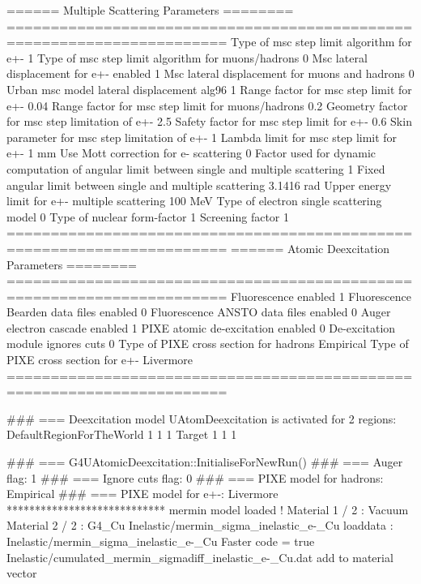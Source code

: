 ======                 Multiple Scattering Parameters          ========
=======================================================================
Type of msc step limit algorithm for e+-           1
Type of msc step limit algorithm for muons/hadrons 0
Msc lateral displacement for e+- enabled           1
Msc lateral displacement for muons and hadrons     0
Urban msc model lateral displacement alg96         1
Range factor for msc step limit for e+-            0.04
Range factor for msc step limit for muons/hadrons  0.2
Geometry factor for msc step limitation of e+-     2.5
Safety factor for msc step limit for e+-           0.6
Skin parameter for msc step limitation of e+-      1
Lambda limit for msc step limit for e+-            1 mm
Use Mott correction for e- scattering              0
Factor used for dynamic computation of angular 
  limit between single and multiple scattering     1
Fixed angular limit between single 
  and multiple scattering                          3.1416 rad
Upper energy limit for e+- multiple scattering     100 MeV
Type of electron single scattering model           0
Type of nuclear form-factor                        1
Screening factor                                   1
=======================================================================
======                 Atomic Deexcitation Parameters          ========
=======================================================================
Fluorescence enabled                               1
Fluorescence Bearden data files enabled            0
Fluorescence ANSTO data files enabled              0
Auger electron cascade enabled                     1
PIXE atomic de-excitation enabled                  0
De-excitation module ignores cuts                  0
Type of PIXE cross section for hadrons             Empirical
Type of PIXE cross section for e+-                 Livermore
=======================================================================

### ===  Deexcitation model UAtomDeexcitation is activated for 2 regions:
          DefaultRegionForTheWorld  1  1  1
          Target  1  1  1

### === G4UAtomicDeexcitation::InitialiseForNewRun()
### ===  Auger flag: 1
### ===  Ignore cuts flag:   0
### ===  PIXE model for hadrons: Empirical
### ===  PIXE model for e+-:     Livermore
****************************
mermin model loaded !
Material 1 / 2 : Vacuum
Material 2 / 2 : G4_Cu
Inelastic/mermin_sigma_inelastic_e-_Cu
loaddata : Inelastic/mermin_sigma_inelastic_e-_Cu
Faster code = true
Inelastic/cumulated_mermin_sigmadiff_inelastic_e-_Cu.dat
add to material vector

